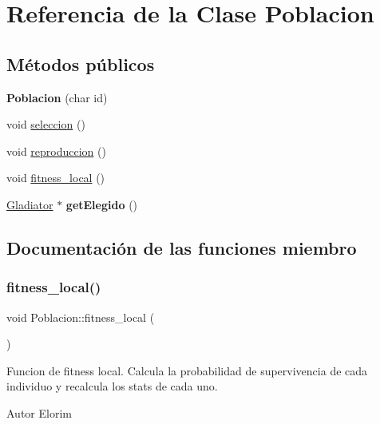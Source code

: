 \hypertarget{classPoblacion}{}\section{Referencia de la Clase Poblacion}
\label{classPoblacion}
\subsection*{Métodos públicos}
\begin{DoxyCompactItemize}
\item 
\mbox{\label{classPoblacion_abb78e93af996577036ccc461da8ef65f}} 
{\bfseries Poblacion} (char id)
\item 
void \hyperlink{classPoblacion_ad2ad3c0864289c0ad9a82780d00dff4f}{seleccion} ()
\item 
void \hyperlink{classPoblacion_a7958576f804f8cfdf83235e79586c4fc}{reproduccion} ()
\item 
void \hyperlink{classPoblacion_a7b35d8509f632ef3a61e7b66ef933f83}{fitness\+\_\+local} ()
\item 
\mbox{\label{classPoblacion_adcdfcc36b6ba6c269c36f7ac60e8f251}} 
\hyperlink{classGladiator}{Gladiator} $\ast$ {\bfseries get\+Elegido} ()
\end{DoxyCompactItemize}


\subsection{Documentación de las funciones miembro}
\mbox{\label{classPoblacion_a7b35d8509f632ef3a61e7b66ef933f83}} 
\subsubsection{\texorpdfstring{fitness\+\_\+local()}{fitness\_local()}}
{\footnotesize\ttfamily void Poblacion\+::fitness\+\_\+local (\begin{DoxyParamCaption}{ }\end{DoxyParamCaption})}

Funcion de fitness local. Calcula la probabilidad de supervivencia de cada individuo y recalcula los stats de cada uno. \begin{DoxyAuthor}{Autor}
Elorim 
\end{DoxyAuthor}
\mbox{\label{classPoblacion_a7958576f804f8cfdf83235e79586c4fc}} 
